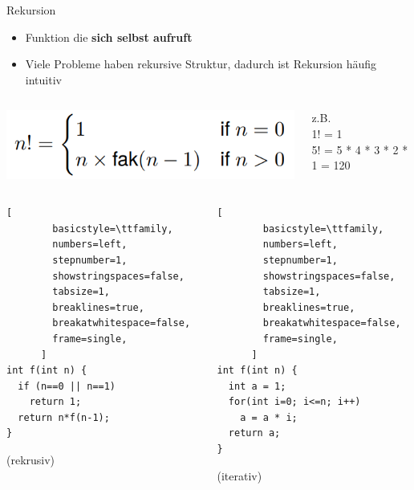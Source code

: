 \documentclass[
  german,            %
  aspectratio=169,    %
]{tumbeamer}
\begin{document}
\begin{frame}[c, fragile]{Rekursion}{}
  \begin{itemize}
    \item Funktion die \textbf{sich selbst aufruft}
    \item Viele Probleme haben rekursive Struktur, dadurch ist Rekursion häufig intuitiv
  \end{itemize}
  \begin{columns}[c]
    \begin{column}{0.48\textwidth}
      \includegraphics[width=0.9\linewidth]{w04_fak_rec_zue.png}
    \end{column}
    \begin{column}{0.48\textwidth}
      z.B. \\
      1! = 1 \\
      5! = 5 * 4 * 3 * 2 * 1 = 120
    \end{column}
  \end{columns}
  \begin{columns}[c]
    \begin{column}{0.48\textwidth}
      \begin{lstlisting}[
        basicstyle=\ttfamily,
        numbers=left,
        stepnumber=1,
        showstringspaces=false,
        tabsize=1,
        breaklines=true,
        breakatwhitespace=false,
        frame=single,
      ]
int f(int n) {
  if (n==0 || n==1)
    return 1;
  return n*f(n-1);
}
      \end{lstlisting}
      \centering
      (rekrusiv)
    \end{column}
    \begin{column}{0.48\textwidth}
      \begin{lstlisting}[
        basicstyle=\ttfamily,
        numbers=left,
        stepnumber=1,
        showstringspaces=false,
        tabsize=1,
        breaklines=true,
        breakatwhitespace=false,
        frame=single,
      ]
int f(int n) {
  int a = 1;
  for(int i=0; i<=n; i++)
    a = a * i;
  return a;
}
      \end{lstlisting}
      \centering
      (iterativ)
    \end{column}
  \end{columns}
\end{frame}
\end{document}

